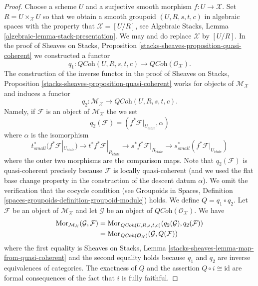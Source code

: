 \begin{proof}
Choose a scheme $U$ and a surjective smooth morphism $f : U \to \mathcal{X}$.
Set $R = U \times_\mathcal{X} U$ so that we obtain a smooth groupoid
$(U, R, s, t, c)$ in algebraic spaces with the property that
$\mathcal{X} = [U/R]$, see
Algebraic Stacks, Lemma \ref{algebraic-lemma-stack-presentation}.
We may and do replace $\mathcal{X}$ by $[U/R]$.
In the proof of
Sheaves on Stacks, Proposition \ref{stacks-sheaves-proposition-quasi-coherent}
we constructed a functor
$$
q_1 :
\textit{QCoh}(U, R, s, t, c)
\longrightarrow
\textit{QCoh}(\mathcal{O}_\mathcal{X}).
$$
The construction of the inverse functor in the proof of
Sheaves on Stacks, Proposition \ref{stacks-sheaves-proposition-quasi-coherent}
works for objects of $\mathcal{M}_\mathcal{X}$ and induces a functor
$$
q_2 :
\mathcal{M}_\mathcal{X}
\longrightarrow
\textit{QCoh}(U, R, s, t, c).
$$
Namely, if $\mathcal{F}$ is an object of $\mathcal{M}_\mathcal{X}$
the we set
$$
q_2(\mathcal{F}) = (f^*\mathcal{F}|_{U_{\acute{e}tale}}, \alpha)
$$
where $\alpha$ is the isomorphism
$$
t_{small}^*(f^*\mathcal{F}|_{U_{\acute{e}tale}})
\to
t^*f^*\mathcal{F}|_{R_{\acute{e}tale}} \to
s^*f^*\mathcal{F}|_{R_{\acute{e}tale}} \to
s_{small}^*(f^*\mathcal{F}|_{U_{\acute{e}tale}})
$$
where the outer two morphisms are the comparison maps. Note that
$q_2(\mathcal{F})$ is quasi-coherent precisely because $\mathcal{F}$ is
locally quasi-coherent (and we used the flat base change property
in the construction of the descent datum $\alpha$). We omit the
verification that the cocycle condition (see
Groupoids in Spaces, Definition
\ref{spaces-groupoids-definition-groupoid-module})
holds. We define $Q = q_1 \circ q_2$.
Let $\mathcal{F}$ be an object of $\mathcal{M}_\mathcal{X}$ and
let $\mathcal{G}$ be an object of $\textit{QCoh}(\mathcal{O}_\mathcal{X})$.
We have
\begin{align*}
\mathop{\rm Mor}\nolimits_{\mathcal{M}_\mathcal{X}}(\mathcal{G}, \mathcal{F})
& =
\mathop{\rm Mor}\nolimits_{\textit{QCoh}(U, R, s, t, c)}(q_2(\mathcal{G}), q_2(\mathcal{F})) \\
& =
\mathop{\rm Mor}\nolimits_{\textit{QCoh}(\mathcal{O}_\mathcal{X})}(\mathcal{G}, Q(\mathcal{F}))
\end{align*}
where the first equality is
Sheaves on Stacks, Lemma \ref{stacks-sheaves-lemma-map-from-quasi-coherent}
and the second equality holds because $q_1$ and $q_2$ are inverse
equivalences of categories. The exactness of $Q$ and the assertion
$Q \circ i \cong \text{id}$
are formal consequences of the fact that $i$ is fully faithful.
\end{proof}

